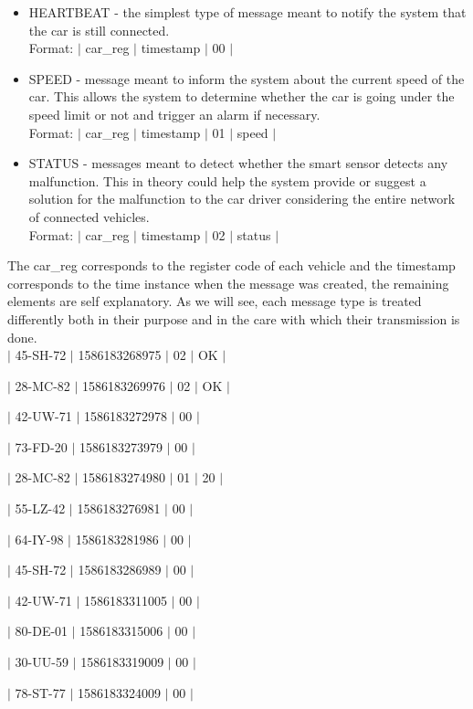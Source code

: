\documentclass[12pt]{article}
\begin{document}
\vspace{-10pt}
\begin{itemize}[noitemsep]
  \item HEARTBEAT - the simplest type of message meant to notify the system that the car is still connected. \\ Format: $|$ car\_reg $|$ timestamp $|$ 00 $|$
  \item SPEED - message meant to inform the system about the current speed of the car. This allows the system to determine whether the car is going under the speed limit or not and trigger an alarm if necessary. \\ Format: $|$ car\_reg $|$ timestamp $|$ 01 $|$ speed $|$
  \item STATUS - messages meant to detect whether the smart sensor detects any malfunction. This in theory could help the system provide or suggest a solution for the malfunction to the car driver considering the entire network of connected vehicles. \\ Format: $|$ car\_reg $|$ timestamp $|$ 02 $|$ status $|$
\end{itemize}
\vspace{-10pt}
The car\_reg corresponds to the register code of each vehicle and the timestamp corresponds to the time instance when the message was created, the remaining 
elements are self explanatory.
As we will see, each message type is treated differently both in their purpose and in the care with which their transmission is done. \\
  
$|$ 45-SH-72 $|$ 1586183268975 $|$ 02 $|$ OK $|$

$|$ 28-MC-82 $|$ 1586183269976 $|$ 02 $|$ OK $|$

$|$ 42-UW-71 $|$ 1586183272978 $|$ 00 $|$

$|$ 73-FD-20 $|$ 1586183273979 $|$ 00 $|$

$|$ 28-MC-82 $|$ 1586183274980 $|$ 01 $|$ 20 $|$

$|$ 55-LZ-42 $|$ 1586183276981 $|$ 00 $|$

$|$ 64-IY-98 $|$ 1586183281986 $|$ 00 $|$

$|$ 45-SH-72 $|$ 1586183286989 $|$ 00 $|$

$|$ 42-UW-71 $|$ 1586183311005 $|$ 00 $|$

$|$ 80-DE-01 $|$ 1586183315006 $|$ 00 $|$

$|$ 30-UU-59 $|$ 1586183319009 $|$ 00 $|$

$|$ 78-ST-77 $|$ 1586183324009 $|$ 00 $|$
\end{document}
